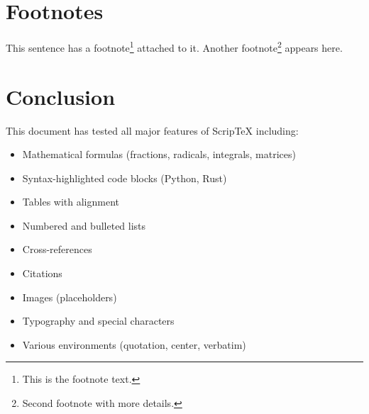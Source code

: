 \documentclass[12pt]{article}
\begin{document}
\section{Footnotes}

This sentence has a footnote\footnote{This is the footnote text.} attached to it.
Another footnote\footnote{Second footnote with more details.} appears here.

\section{Conclusion}

This document has tested all major features of ScripTeX including:
\begin{itemize}
\item Mathematical formulas (fractions, radicals, integrals, matrices)
\item Syntax-highlighted code blocks (Python, Rust)
\item Tables with alignment
\item Numbered and bulleted lists
\item Cross-references
\item Citations
\item Images (placeholders)
\item Typography and special characters
\item Various environments (quotation, center, verbatim)
\end{itemize}
\end{document}
